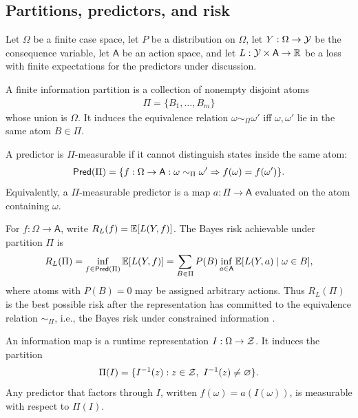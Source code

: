 \subsection{Partitions, predictors, and risk}

Let $\Omega$ be a finite case space, let $P$ be a distribution on $\Omega$, let $Y:\Omega\to\mathcal{Y}$ be the consequence variable, let $\mathsf A$ be an action space, and let $L:\mathcal{Y}\times\mathsf A\to\mathbb{R}$ be a loss with finite expectations for the predictors under discussion.

\begin{definition}
\label{def:partition-measurable}
A finite information partition is a collection of nonempty disjoint atoms
\begin{align*}
\Pi=\{B_1,\ldots,B_m\}
\end{align*}
whose union is $\Omega$. It induces the equivalence relation $\omega\sim_\Pi\omega'$ iff $\omega,\omega'$ lie in the same atom $B\in\Pi$.

A predictor is $\Pi$-measurable if it cannot distinguish states inside the same atom:
\begin{align*}
\mathsf{Pred}(\Pi)
=
\{f:\Omega\to\mathsf A:
\omega\sim_\Pi\omega'\Rightarrow f(\omega)=f(\omega')\}.
\end{align*}
Equivalently, a $\Pi$-measurable predictor is a map $a:\Pi\to\mathsf A$ evaluated on the atom containing $\omega$.
\end{definition}

\begin{definition}
\label{def:partition-bayes-risk}
For $f:\Omega\to\mathsf A$, write $R_L(f)=\operatorname*{\mathbb{E}}[L(Y,f)]$. The Bayes risk achievable under partition $\Pi$ is
\begin{align*}
R_L(\Pi)
=
\inf_{f\in\mathsf{Pred}(\Pi)}
\operatorname*{\mathbb{E}}[L(Y,f)]
=
\sum_{B\in\Pi}P(B)
\inf_{a\in\mathsf A}\operatorname*{\mathbb{E}}[L(Y,a)\mid \omega\in B],
\end{align*}
where atoms with $P(B)=0$ may be assigned arbitrary actions. Thus $R_L(\Pi)$ is the best possible risk after the representation has committed to the equivalence relation $\sim_\Pi$, i.e., the Bayes risk under constrained information \citep{berger1985statistical}.
\end{definition}

\begin{definition}
\label{def:information-map-partition}
An information map is a runtime representation $I:\Omega\to\mathcal{Z}$. It induces the partition
\begin{align*}
\Pi(I)=\{I^{-1}(z):z\in\mathcal{Z},\ I^{-1}(z)\ne\varnothing\}.
\end{align*}
Any predictor that factors through $I$, written $f(\omega)=a(I(\omega))$, is measurable with respect to $\Pi(I)$.
\end{definition}

